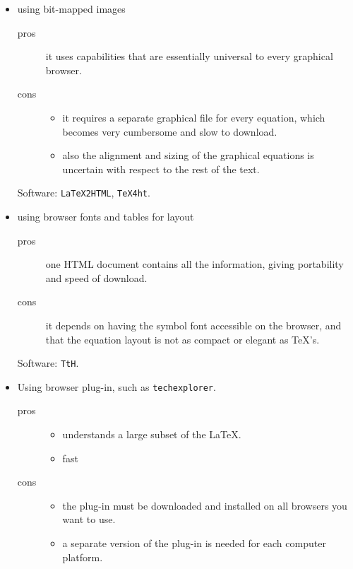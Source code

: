 \documentclass[landscape, headrule, footrule]{foils}
\begin{document}
\begin{itemize}
  \item using bit-mapped images
    \begin{description}
      \item[pros] it uses capabilities that are essentially universal to every graphical
browser.
      \item[cons] \quad
\begin{itemize}
  \item it requires a separate graphical file for every equation, which becomes very
cumbersome and slow to download.

  \item also the alignment and sizing of the graphical equations is uncertain with respect to the rest of the text.
\end{itemize}
    \end{description}

Software: \texttt{LaTeX2HTML}, \texttt{TeX4ht}.


  \item using browser fonts and tables for layout
    \begin{description}
      \item[pros] one HTML document contains all the information, giving portability and speed of
download. 
      \item[cons] it depends on having the symbol font accessible on the browser, and that the equation layout 
is not as compact or elegant as \TeX's.
    \end{description}

Software: \texttt{TtH}.

\end{itemize}




\begin{itemize}
  \item Using browser plug-in, such as \texttt{techexplorer}.
\begin{description}
  \item[pros] \quad
\begin{itemize}
  \item understands a large subset of the \LaTeX.
  \item fast
\end{itemize}
  \item[cons]\quad
\begin{itemize}
  \item the plug-in must be downloaded and installed on all browsers you want to use.
  \item a separate version of the plug-in is needed for each computer platform.
\end{itemize}
\end{description}
\end{itemize}
\end{document}
